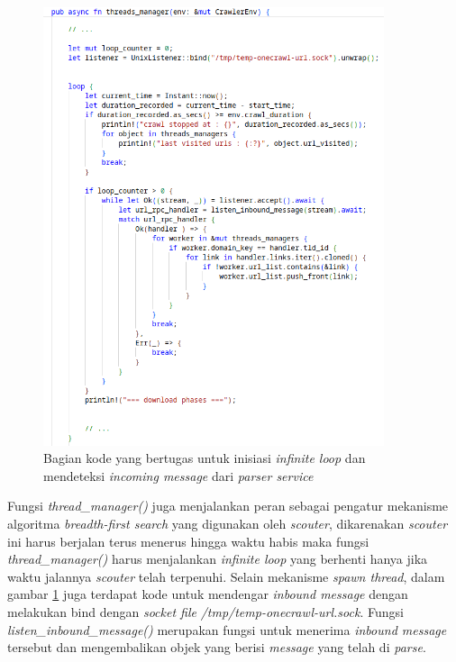 \begin{figure}[H]
  \centering
  \includegraphics[keepaspectratio, width=10cm]{gambar/thread_manager-code-loop.png}
  \caption{Bagian kode yang bertugas untuk inisiasi \emph{infinite loop} dan mendeteksi \emph{incoming message} dari \emph{parser service}}
  \label{gambar:code-loop-thread-manager}
\end{figure}

Fungsi \emph{thread\_manager()} juga menjalankan peran sebagai pengatur mekanisme algoritma \emph{breadth-first search} yang digunakan oleh \emph{scouter}, dikarenakan \emph{scouter} ini harus berjalan terus menerus hingga waktu habis maka fungsi \emph{thread\_manager()} harus menjalankan \emph{infinite loop} yang berhenti hanya jika waktu jalannya \emph{scouter} telah terpenuhi. Selain mekanisme \emph{spawn thread}, dalam gambar \ref{gambar:code-loop-thread-manager} juga terdapat kode untuk mendengar \emph{inbound message} dengan melakukan bind dengan \emph{socket file} \emph{/tmp/temp-onecrawl-url.sock}. Fungsi \emph{listen\_inbound\_message()} merupakan fungsi untuk menerima \emph{inbound message} tersebut dan mengembalikan objek yang berisi \emph{message} yang telah di \emph{parse}.

